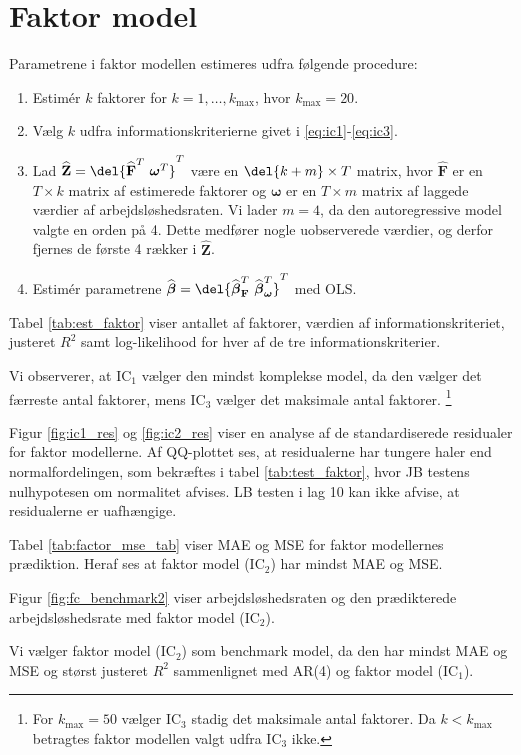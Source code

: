 \section{Faktor model}
Parametrene i faktor modellen estimeres udfra følgende procedure:
\begin{enumerate}
\item Estimér $k$ faktorer for $k = 1, \dots, k_{\max}$, hvor $k_{\max} = 20$.  
\item Vælg $k$ udfra informationskriterierne givet i \eqref{eq:ic1}-\eqref{eq:ic3}.
\item Lad \(\widehat{\textbf{Z}} = \del{\widehat{{\textbf{F}}}^T \ \boldsymbol{\omega}^T}^T\) være en \(\del{k+m} \times T\) matrix, hvor \(\widehat{{\textbf{F}}}\) er en \(T \times k\) matrix af estimerede faktorer og \(\boldsymbol{\omega}\) er en \(T \times m\) matrix af laggede værdier af arbejdsløshedsraten.
Vi lader \(m = 4\), da den autoregressive model valgte en orden på 4.
Dette medfører nogle uobserverede værdier, og derfor fjernes de første 4 rækker i \(\widehat{\textbf{Z}}\).
\item Estimér parametrene $\widehat{\boldsymbol{\beta}} = \del{ \widehat{\boldsymbol{\beta}}^T_{\textbf{F}} \ \widehat{\boldsymbol{\beta}}^T_{\boldsymbol{\omega}}}^T$ med OLS.
\end{enumerate}

Tabel \ref{tab:est_faktor} viser antallet af faktorer, værdien af informationskriteriet, justeret \(R^2\) samt log-likelihood for hver af de tre informationskriterier. 


Vi observerer, at IC$_1$ vælger den mindst komplekse model, da den vælger det færreste antal faktorer, mens IC$_3$ vælger det maksimale antal faktorer. \footnote{For \(k_\text{max} = 50\) vælger IC\(_3\) stadig det maksimale antal faktorer. Da \(k<k_\text{max}\) betragtes faktor modellen valgt udfra IC\(_3\) ikke.} 

Figur \ref{fig:ic1_res} og \ref{fig:ic2_res} viser en analyse af de standardiserede residualer for faktor modellerne.
Af QQ-plottet ses, at residualerne har tungere haler end normalfordelingen, som bekræftes i tabel \ref{tab:test_faktor}, hvor JB testens nulhypotesen om normalitet afvises.
LB testen i lag 10 kan ikke afvise, at residualerne er uafhængige.



Tabel \ref{tab:factor_mse_tab} viser MAE og MSE for faktor modellernes prædiktion.
Heraf ses at faktor model (IC\(_2\)) har mindst MAE og MSE.



Figur \ref{fig:fc_benchmark2} viser arbejdsløshedsraten og den prædikterede arbejdsløshedsrate med faktor model (IC\(_2\)).

Vi vælger faktor model (IC\(_2\)) som benchmark model, da den har mindst MAE og MSE og størst justeret \(R^2\) sammenlignet med AR(4) og faktor model (IC\(_1\)).
